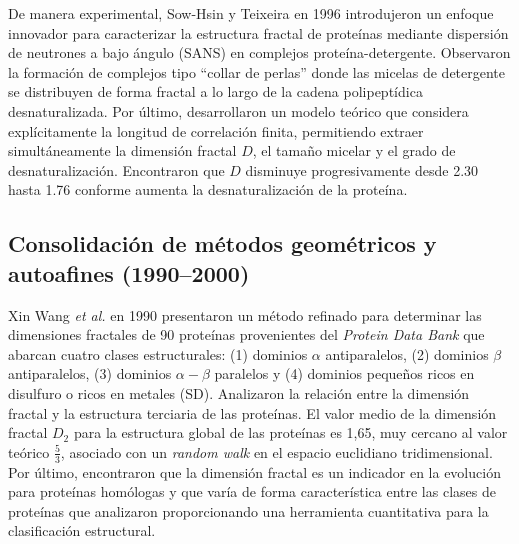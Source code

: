 De manera experimental, Sow-Hsin y Teixeira \cite{Chen1986} en 1996 introdujeron un enfoque innovador para caracterizar la estructura fractal de prote\'{i}nas mediante dispersi\'{o}n de neutrones a bajo \'{a}ngulo (SANS) en complejos prote\'{i}na-detergente. Observaron la formaci\'{o}n de complejos tipo ``collar de perlas'' donde las micelas de detergente se distribuyen de forma fractal a lo largo de la cadena polipept\'{i}dica desnaturalizada. Por \'{u}ltimo, desarrollaron un modelo te\'{o}rico que considera expl\'{i}citamente la longitud de correlaci\'{o}n finita, permitiendo extraer simult\'{a}neamente la dimensi\'{o}n fractal $D$, el tamaño micelar y el grado de desnaturalizaci\'{o}n. Encontraron que $D$ disminuye progresivamente desde 2.30 hasta 1.76 conforme aumenta la desnaturalizaci\'{o}n de la prote\'{i}na.

\subsection{Consolidaci\'{o}n de m\'{e}todos geom\'{e}tricos y autoafines (1990--2000)}


Xin Wang \textit{et al.} \cite{Wang1990} en 1990 presentaron un m\'{e}todo refinado para determinar las dimensiones fractales de 90 prote\'{i}nas provenientes del \textit{Protein Data Bank} que abarcan cuatro clases estructurales: (1) dominios $\alpha$ antiparalelos, (2) dominios $\beta$ antiparalelos, (3) dominios $\alpha-\beta$ paralelos y (4) dominios pequeños ricos en disulfuro o ricos en metales (SD). Analizaron la relaci\'{o}n entre la dimensi\'{o}n fractal y la estructura terciaria de las prote\'{i}nas. El valor medio de la dimensi\'{o}n fractal $D_{2}$ para la estructura global de las prote\'{i}nas es 1,65, muy cercano al valor te\'{o}rico $\frac{5}{3}$, asociado con un \textit{random walk} en el espacio euclidiano tridimensional. Por \'{u}ltimo, encontraron que la dimensi\'{o}n fractal es un indicador en la evoluci\'{o}n para prote\'{i}nas hom\'{o}logas y que var\'{i}a de forma caracter\'{i}stica entre las clases de prote\'{i}nas que analizaron proporcionando una herramienta cuantitativa para la clasificaci\'{o}n estructural.


